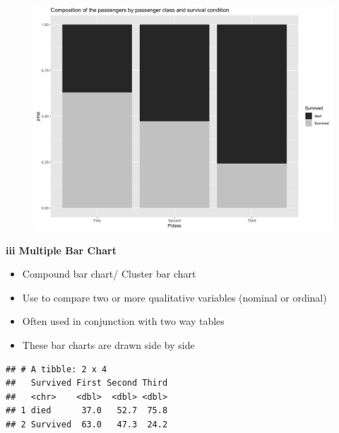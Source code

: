 \documentclass[]{book}
\providecommand{\tightlist}{%
  \setlength{\itemsep}{0pt}\setlength{\parskip}{0pt}}
\begin{document}
\begin{figure}

{\centering \includegraphics[width=1\linewidth]{figure/box11-1} 

}

\end{figure}

\textbf{iii Multiple Bar Chart}

\begin{itemize}
\tightlist
\item
  Compound bar chart/ Cluster bar chart
\item
  Use to compare two or more qualitative variables (nominal or ordinal)
\item
  Often used in conjunction with two way tables
\item
  These bar charts are drawn side by side
\end{itemize}

\begin{verbatim}
## # A tibble: 2 x 4
##   Survived First Second Third
##   <chr>    <dbl>  <dbl> <dbl>
## 1 died      37.0   52.7  75.8
## 2 Survived  63.0   47.3  24.2
\end{verbatim}
\end{document}
